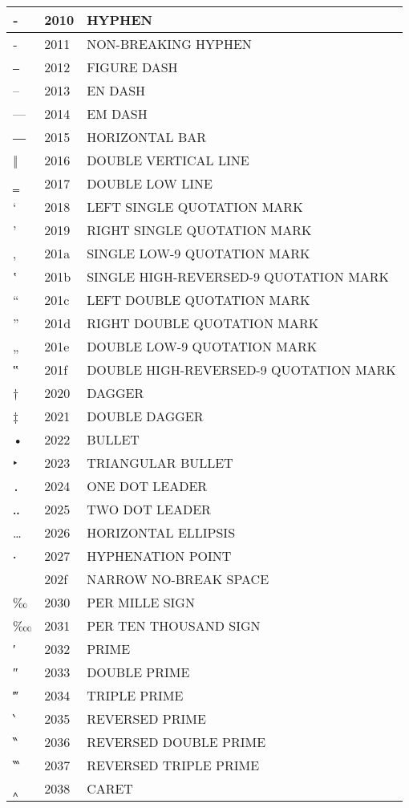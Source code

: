 \documentclass[12pt,letterpaper,openany]{book}
\begin{document}
\begin{center}
\begin{supertabular}{|m{0.25in}|m{0.5in}|m{4in}|}
‐ & 2010 & HYPHEN\\\hline
‑ & 2011 & NON-BREAKING HYPHEN\\\hline
‒ & 2012 & FIGURE DASH\\\hline
– & 2013 & EN DASH\\\hline
— & 2014 & EM DASH\\\hline
― & 2015 & HORIZONTAL BAR\\\hline
‖ & 2016 & DOUBLE VERTICAL LINE\\\hline
‗ & 2017 & DOUBLE LOW LINE\\\hline
‘ & 2018 & LEFT SINGLE QUOTATION MARK\\\hline
’ & 2019 & RIGHT SINGLE QUOTATION MARK\\\hline
‚ & 201a & SINGLE LOW-9 QUOTATION MARK\\\hline
‛ & 201b & SINGLE HIGH-REVERSED-9 QUOTATION MARK\\\hline
“ & 201c & LEFT DOUBLE QUOTATION MARK\\\hline
” & 201d & RIGHT DOUBLE QUOTATION MARK\\\hline
„ & 201e & DOUBLE LOW-9 QUOTATION MARK\\\hline
‟ & 201f & DOUBLE HIGH-REVERSED-9 QUOTATION MARK\\\hline
† & 2020 & DAGGER\\\hline
‡ & 2021 & DOUBLE DAGGER\\\hline
• & 2022 & BULLET\\\hline
‣ & 2023 & TRIANGULAR BULLET\\\hline
․ & 2024 & ONE DOT LEADER\\\hline
‥ & 2025 & TWO DOT LEADER\\\hline
… & 2026 & HORIZONTAL ELLIPSIS\\\hline
‧ & 2027 & HYPHENATION POINT\\\hline
  & 202f & NARROW NO-BREAK SPACE\\\hline
‰ & 2030 & PER MILLE SIGN\\\hline
‱ & 2031 & PER TEN THOUSAND SIGN\\\hline
′ & 2032 & PRIME\\\hline
″ & 2033 & DOUBLE PRIME\\\hline
‴ & 2034 & TRIPLE PRIME\\\hline
‵ & 2035 & REVERSED PRIME\\\hline
‶ & 2036 & REVERSED DOUBLE PRIME\\\hline
‷ & 2037 & REVERSED TRIPLE PRIME\\\hline
‸ & 2038 & CARET\\\hline

\end{supertabular}
\end{center}
\end{document}
